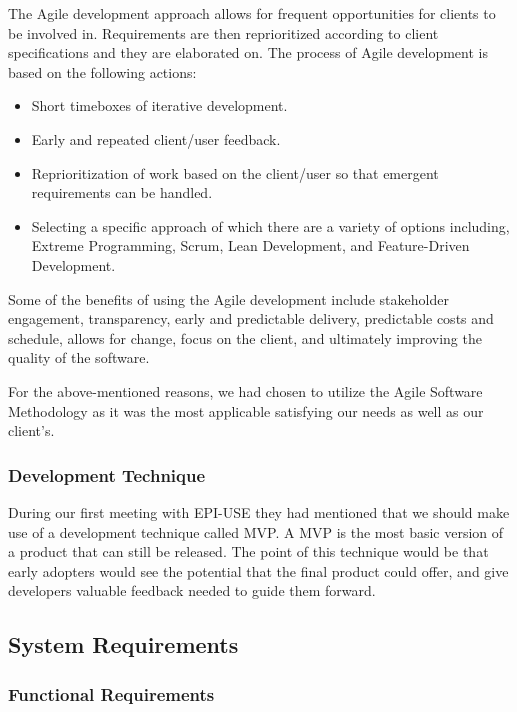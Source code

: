 \begin{flushleft}

The Agile development approach allows for frequent opportunities for clients to be involved in. Requirements are then reprioritized according to client specifications and they are elaborated on. The process of Agile development is based on the following actions:

        \begin{itemize}
			\item Short timeboxes of iterative development.
			\item Early and repeated client/user feedback.
			\item Reprioritization of work based on the client/user so that emergent requirements can be handled.
			\item Selecting a specific approach of which there are a variety of options including, Extreme Programming, Scrum, Lean Development, and Feature-Driven Development.
		\end{itemize}

Some of the benefits of using the Agile development include stakeholder engagement, transparency, early and predictable delivery, predictable costs and schedule, allows for change, focus on the client, and ultimately improving the quality of the software.

For the above-mentioned reasons, we had chosen to utilize the Agile Software Methodology as it was the most applicable satisfying our needs as well as our client's.

	\subsubsection{Development Technique}
	During our first meeting with EPI-USE they had mentioned that we should make use of a development technique called MVP. A MVP is the most basic version of a product that can still be released. The point of this technique would be that early adopters would see the potential that the final product could offer, and give developers valuable feedback needed to guide them forward.

\subsection{System Requirements}

	\subsubsection{Functional Requirements}


\end{flushleft}

